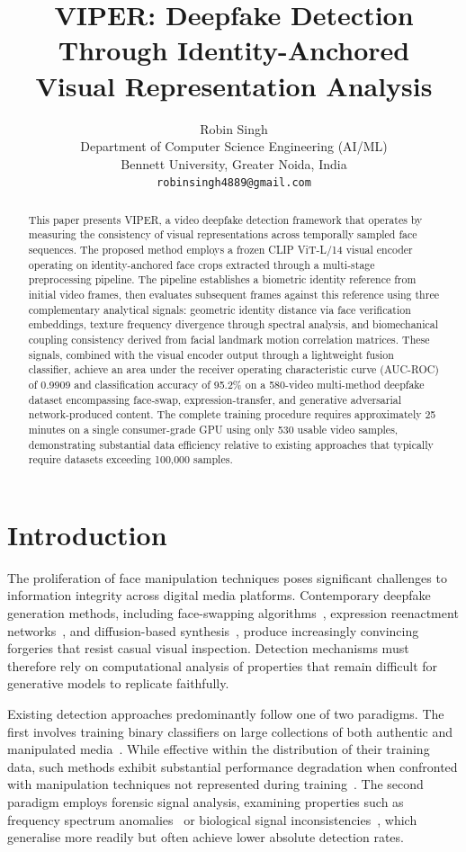 \documentclass[11pt, twocolumn]{article}
\title{\textbf{VIPER: Deepfake Detection Through Identity-Anchored\\Visual Representation Analysis}}
\author{Robin Singh\\
Department of Computer Science Engineering (AI/ML)\\
Bennett University, Greater Noida, India\\
\texttt{robinsingh4889@gmail.com}}
\date{}
\begin{document}
\sloppy
\maketitle

\begin{abstract}
This paper presents VIPER, a video deepfake detection framework that operates by measuring the consistency of visual representations across temporally sampled face sequences.
The proposed method employs a frozen CLIP ViT-L/14 visual encoder operating on identity-anchored face crops extracted through a multi-stage preprocessing pipeline. The pipeline establishes a biometric identity reference from initial video frames, then evaluates subsequent frames against this reference using three complementary analytical signals: geometric identity distance via face verification embeddings, texture frequency divergence through spectral analysis, and biomechanical coupling consistency derived from facial landmark motion correlation matrices. These signals, combined with the visual encoder output through a lightweight fusion classifier, achieve an area under the receiver operating characteristic curve (AUC-ROC) of 0.9909 and classification accuracy of 95.2\% on a 580-video multi-method deepfake dataset encompassing face-swap, expression-transfer, and generative adversarial network-produced content. The complete training procedure requires approximately 25 minutes on a single consumer-grade GPU using only 530 usable video samples, demonstrating substantial data efficiency relative to existing approaches that typically require datasets exceeding 100,000 samples.
\end{abstract}

\section{Introduction}

The proliferation of face manipulation techniques poses significant challenges to information integrity across digital media platforms. Contemporary deepfake generation methods, including face-swapping algorithms~\cite{faceswap2020}, expression reenactment networks~\cite{thies2016face2face}, and diffusion-based synthesis~\cite{rombach2022ldm}, produce increasingly convincing forgeries that resist casual visual inspection. Detection mechanisms must therefore rely on computational analysis of properties that remain difficult for generative models to replicate faithfully.

Existing detection approaches predominantly follow one of two paradigms. The first involves training binary classifiers on large collections of both authentic and manipulated media~\cite{rossler2019faceforensics, chollet2017xception}. While effective within the distribution of their training data, such methods exhibit substantial performance degradation when confronted with manipulation techniques not represented during training~\cite{cozzolino2021id}. The second paradigm employs forensic signal analysis, examining properties such as frequency spectrum anomalies~\cite{frank2020leveraging} or biological signal inconsistencies~\cite{li2018ictu}, which generalise more readily but often achieve lower absolute detection rates.
\end{document}
